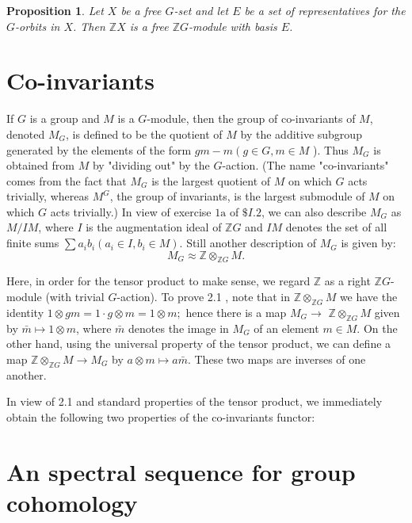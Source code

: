 \documentclass{book}
\newtheorem{prop}{Proposition}
\begin{document}
\begin{prop}
Let $X$ be a free $G$-set and let $E$ be a set of representatives for the $G$-orbits in $X$. Then $\mathbb{Z}X$ is a free $\mathbb{Z}G$-module with basis $E$.
\end{prop}


\section{Co-invariants}
If $G$ is a group and $M$ is a $G$-module, then the group of co-invariants of $M$, denoted $M_G$, is defined to be the quotient of $M$ by the additive subgroup generated by the elements of the form $g m-m\left(g \in G, m \in M\right.$ ). Thus $M_G$ is obtained from $M$ by "dividing out" by the $G$-action. (The name "co-invariants" comes from the fact that $M_G$ is the largest quotient of $M$ on which $G$ acts trivially, whereas $M^G$, the group of invariants, is the largest submodule of $M$ on which $G$ acts trivially.) In view of exercise $1 \mathrm{a}$ of $\$ I .2$, we can also describe $M_G$ as $M / I M$, where $I$ is the augmentation ideal of $\mathbb{Z} G$ and $I M$ denotes the set of all finite sums $\sum a_i b_i\left(a_i \in I, b_i \in M\right)$.
Still another description of $M_G$ is given by:
$$
M_G \approx \mathbb{Z} \otimes_{\mathbb{Z} G} M .
$$

Here, in order for the tensor product to make sense, we regard $\mathbb{Z}$ as a right $\mathbb{Z} G$-module (with trivial $G$-action). To prove 2.1 , note that in $\mathbb{Z} \otimes_{\mathbb{Z} G} M$ we have the identity $1 \otimes g m=1 \cdot g \otimes m=1 \otimes m ;$ hence there is a map $M_G \rightarrow$ $\mathbb{Z} \otimes_{\mathbb{Z} G} M$ given by $\bar{m} \mapsto 1 \otimes m$, where $\bar{m}$ denotes the image in $M_G$ of an element $m \in M$. On the other hand, using the universal property of the tensor product, we can define a map $\mathbb{Z} \otimes_{\mathbb{Z} G} M \rightarrow M_G$ by $a \otimes m \mapsto a \bar{m}$. These two maps are inverses of one another.

In view of 2.1 and standard properties of the tensor product, we immediately obtain the following two properties of the co-invariants functor:




\section{An spectral sequence for group cohomology}
\end{document}
